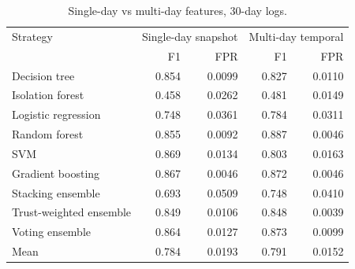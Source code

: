 \begin{table}[H]
\centering
\small
\begin{tabular}{lrrrr}
\toprule
Strategy & \multicolumn{2}{c}{Single-day snapshot} & \multicolumn{2}{c}{Multi-day temporal} \\
 & F1 & FPR & F1 & FPR \\
\midrule
Decision tree & 0.854 & 0.0099 & 0.827 & 0.0110 \\
Isolation forest & 0.458 & 0.0262 & 0.481 & 0.0149 \\
Logistic regression & 0.748 & 0.0361 & 0.784 & 0.0311 \\
Random forest & 0.855 & 0.0092 & 0.887 & 0.0046 \\
SVM & 0.869 & 0.0134 & 0.803 & 0.0163 \\
Gradient boosting & 0.867 & 0.0046 & 0.872 & 0.0046 \\
Stacking ensemble & 0.693 & 0.0509 & 0.748 & 0.0410 \\
Trust-weighted ensemble & 0.849 & 0.0106 & 0.848 & 0.0039 \\
Voting ensemble & 0.864 & 0.0127 & 0.873 & 0.0099 \\
\midrule
Mean & 0.784 & 0.0193 & 0.791 & 0.0152 \\
\bottomrule
\end{tabular}
\caption{Single-day vs multi-day features, 30-day logs.}
\label{tab:ablation-month}
\end{table}
